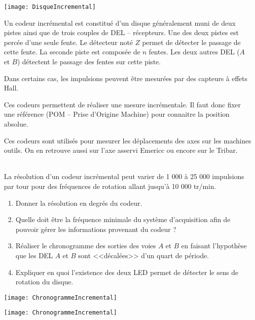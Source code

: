 \begin{marginfigure}
\texttt{[image: DisqueIncremental]}
\end{marginfigure}


Un codeur incrémental est constitué d'un disque généralement muni de deux pistes ainsi que de trois couples de DEL -- récepteurs. Une des deux pistes est percée d'une seule fente. Le détecteur noté $Z$ permet de détecter le passage de cette fente. La seconde piste est composée de $n$ fentes. Les deux autres DEL ($A$ et $B$) détectent le passage des fentes sur cette piste. 

Dans certains cas, les impulsions peuvent être mesurées par des capteurs à effets Hall. 

Ces codeurs permettent de réaliser une mesure incrémentale. Il faut donc fixer une référence (POM -- Prise d'Origine Machine) pour connaitre la position absolue.

Ces codeurs sont utilisés pour mesurer les déplacements des axes sur les machines outils. On en retrouve aussi sur l'axe asservi Emericc ou encore sur le Tribar.



\begin{exemple} ~\\
La résolution d'un codeur incrémental peut varier de 1 000 à 25 000 impulsions par tour pour des fréquences de rotation allant jusqu'à 10 000 tr/min.
\begin{enumerate}
\item Donner la résolution en degrés du codeur. 
\item Quelle doit être la fréquence minimale du système d'acquisition afin de pouvoir gérer les informations provenant du codeur ?
\item Réaliser le chronogramme des sorties des voies $A$ et $B$ en faisant l'hypothèse que les DEL $A$ et $B$ sont <<décalées>> d'un quart de période.
\item Expliquer en quoi l'existence des deux LED permet de détecter le sens de rotation du disque. 
\end{enumerate}

\begin{minipage}[c]{.45\linewidth}
\begin{center}
\texttt{[image: ChronogrammeIncremental]}
\end{center}
\end{minipage} \hfill
\begin{minipage}[c]{.45\linewidth}
\begin{center}
\texttt{[image: ChronogrammeIncremental]}
\end{center}
\end{minipage}
\end{exemple}



